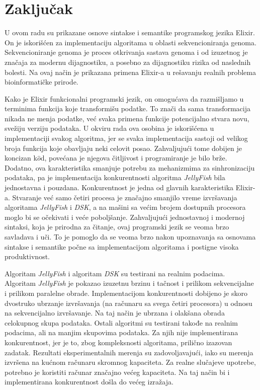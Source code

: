 \documentclass[12pt,oneside]{memoir}
\begin{document}
\chapter{Zaključak}
\label{poglavlje:Zaključak}

U ovom radu su prikazane osnove sintakse i semantike programskog jezika Elixir. On je iskorišćen za implementaciju algoritama u oblasti sekvencioniranja genoma. Sekvencioniranje genoma je proces otkrivanja sastava genoma i od izuzetnog je značaja za modernu dijagnostiku, a posebno za dijagnostiku rizika od naslednih bolesti. Na ovaj način je prikazana primena Elixir-a u rešavanju realnih problema bioinformatičke prirode.

Kako je Elixir funkcionalni programski jezik, on omogućava da razmišljamo u terminima funkcija koje transformišu podatke. To znači da sama transformacija nikada ne menja podatke, već svaka primena funkcije potencijalno stvara novu, svežiju verziju podataka. U okviru rada ova osobina je iskorišćena u implementaciji svakog algoritma, jer se svaka implementacija sastoji od velikog broja funkcija koje obavljaju neki celovit posao.  Zahvaljujući tome dobijen je koncizan k$\hat{o}$d, povećana je njegova čitljivost i programiranje je bilo brže. Dodatno, ova karakteristika smanjuje potrebu za mehanizmima za sinhronizaciju podataka, pa je implementacija konkurentnosti algoritma \textit{JellyFish} bila jednostavna i pouzdana. Konkurentnost je jedna od glavnih karakteristika Elixir-a. Stvaranje već samo četiri procesa je značajno smanjilo vreme izvršavanja algoritama \textit{JellyFish} i \textit{DSK}, a na mašini sa većim brojem dostupnih procesora moglo bi se očekivati i veće poboljšanje. Zahvaljujući jednostavnoj i modernoj sintaksi, koja je prirodna za čitanje, ovaj programski jezik se veoma brzo savladava i uči. To je pomoglo da se veoma brzo nakon upoznavanja sa osnovama sintakse i semantike počne sa implementacijom algoritama i postigne visoka produktivnost.

Algoritam \textit{JellyFish} i algoritam \textit{DSK} su testirani na realnim podacima. Algoritam \textit{JellyFish} je pokazao izuzetnu brzinu i tačnost i prilikom sekvencijalne i prilikom paralelne obrade. Implementacijom konkurentnosti dobijeno je skoro dvostruko ubrzanje izvršavanja (na računaru sa svega četiri procesora) u odnosu na sekvencijalno izvršavanje. Na taj način je ubrzana i olakšana obrada celokupnog skupa podataka. Ostali algoritmi su testirani takođe na realnim podacima, ali na manjim skupovima podataka. Za njih nije implementirana konkurentnost, jer je to, zbog kompleksnosti algoritama, prilično izazovan zadatak. Rezultati eksperimentalnih merenja su zadovoljavajući, iako su merenja izvršena na kućnom računaru skromnog kapaciteta. Za realne slučajeve upotrebe, potrebno je koristiti računar značajno većeg kapaciteta. Na taj način bi i implementirana konkurentnost došla do većeg izražaja.
\end{document}
